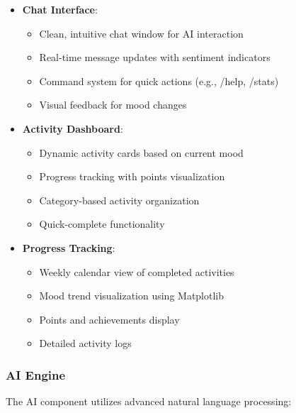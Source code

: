 \documentclass[12pt]{article}
\begin{document}
\begin{itemize}
    \item \textbf{Chat Interface}: 
    \begin{itemize}
        \item Clean, intuitive chat window for AI interaction
        \item Real-time message updates with sentiment indicators
        \item Command system for quick actions (e.g., /help, /stats)
        \item Visual feedback for mood changes
    \end{itemize}
    
    \item \textbf{Activity Dashboard}:
    \begin{itemize}
        \item Dynamic activity cards based on current mood
        \item Progress tracking with points visualization
        \item Category-based activity organization
        \item Quick-complete functionality
    \end{itemize}
    
    \item \textbf{Progress Tracking}:
    \begin{itemize}
        \item Weekly calendar view of completed activities
        \item Mood trend visualization using Matplotlib
        \item Points and achievements display
        \item Detailed activity logs
    \end{itemize}
\end{itemize}

\subsubsection{AI Engine}
The AI component utilizes advanced natural language processing:
\end{document}

